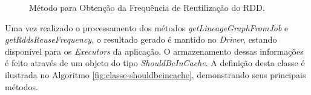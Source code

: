 \begin{figure}[!ht]
    \begin{algorithm}[H]
    \caption{Método para Obtenção da Frequência de Reutilização do RDD.}
        \label{fig:metodo-getReuseFrequency}
            
            \BlankLine
    \end{algorithm}
\end{figure}

Uma vez realizado o processamento dos métodos \textit{getLineageGraphFromJob} e \textit{getRddsReuseFrequency}, o resultado gerado é mantido no \textit{Driver}, estando disponível para os \textit{Executors} da aplicação. O armazenamento dessas informações é feito através de um objeto do tipo  \textit{ShouldBeInCache}. A definição desta classe é ilustrada no Algoritmo \ref{fig:classe-shouldbeincache}, demonstrando seus principais métodos.


